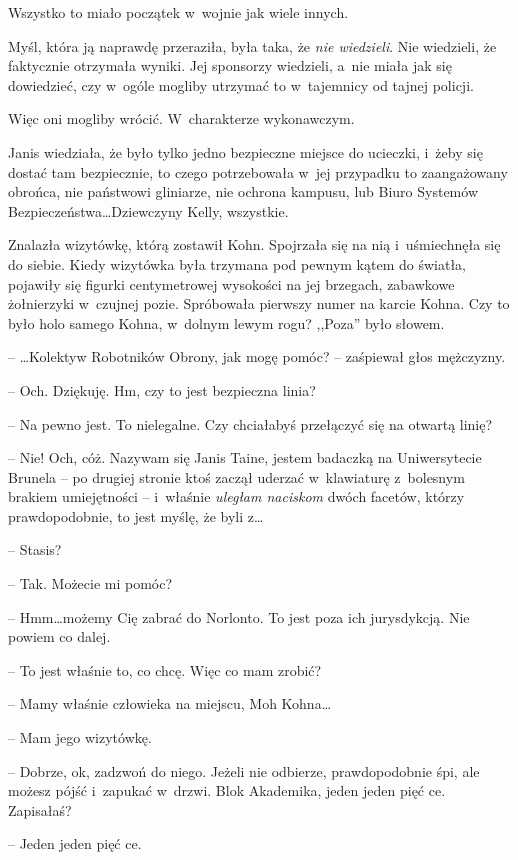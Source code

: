 \documentclass[oneside,polish,11pt,sfheadings]{mwbk}
\begin{document}
Wszystko to miało początek w~wojnie jak wiele innych.

Myśl, która ją naprawdę przeraziła, była taka, że \emph{nie wiedzieli}.
Nie wiedzieli, że faktycznie otrzymała wyniki. Jej sponsorzy wiedzieli, a~nie miała jak się dowiedzieć, czy w~ogóle mogliby utrzymać to w~tajemnicy od tajnej policji.

Więc oni mogliby wrócić. W~charakterze wykonawczym.

Janis wiedziała, że było tylko jedno bezpieczne miejsce do ucieczki, i~żeby się dostać tam bezpiecznie, to czego potrzebowała w~jej przypadku
to zaangażowany obrońca, nie państwowi gliniarze, nie ochrona kampusu,
lub Biuro Systemów Bezpieczeństwa\ldots Dziewczyny Kelly, wszystkie.

Znalazła wizytówkę, którą zostawił Kohn. Spojrzała się na nią i~uśmiechnęła się do siebie. Kiedy wizytówka była trzymana pod pewnym
kątem do światła, pojawiły się figurki centymetrowej wysokości na jej
brzegach, zabawkowe żołnierzyki w~czujnej pozie. Spróbowała pierwszy
numer na karcie Kohna. Czy to było holo samego Kohna, w~dolnym lewym
rogu? ,,Poza'' było słowem.

-- \ldots Kolektyw Robotników Obrony, jak mogę pomóc? -- zaśpiewał głos
mężczyzny.

-- Och. Dziękuję. Hm, czy to jest bezpieczna linia?

-- Na pewno jest. To nielegalne. Czy chciałabyś przełączyć się na otwartą
linię?

-- Nie! Och, cóż. Nazywam się Janis Taine, jestem badaczką na
Uniwersytecie Brunela -- po drugiej stronie ktoś zaczął uderzać w~klawiaturę z~bolesnym brakiem umiejętności -- i~właśnie \emph{uległam
naciskom} dwóch facetów, którzy prawdopodobnie, to jest myślę, że byli
z\ldots

-- Stasis?

-- Tak. Możecie mi pomóc?

-- Hmm\ldots możemy Cię zabrać do Norlonto. To jest poza ich jurysdykcją.
Nie powiem co dalej.

-- To jest właśnie to, co chcę. Więc co mam zrobić?

-- Mamy właśnie człowieka na miejscu, Moh Kohna\ldots

-- Mam jego wizytówkę.

-- Dobrze, ok, zadzwoń do niego. Jeżeli nie odbierze, prawdopodobnie śpi,
ale możesz pójść i~zapukać w~drzwi. Blok Akademika, jeden jeden pięć ce.
Zapisałaś?

-- Jeden jeden pięć ce.
\end{document}
